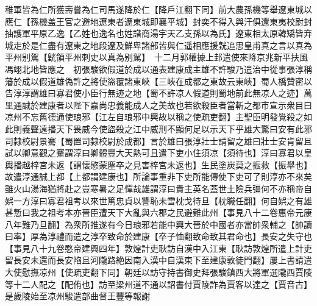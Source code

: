 稚軍皆為仁所獲壽嘗為仁司馬遂降於仁【降戶江翻下同】前大農孫機等舉遼東城以應仁【孫機盖王官之避地遼東者遼東城即襄平城】封奕不得入與汗俱還東夷校尉封抽護軍平原乙逸【乙姓也逸名也姓譜商湯宇天乙支孫以為氏】遼東相太原韓矯皆弃城走於是仁盡有遼東之地段遼及鮮卑諸部皆與仁遥相應援皝追思皇甫真之言以真為平州别駕【皝領平州刺史以真為别駕】　十二月郭權據上邽遣使來降京兆新平扶風馮翊北地皆應之　初張駿欲假道於成以通表建康成主雄不許駿乃遣治中從事張淳稱藩於成以假道雄偽許之將使盜覆諸東峽【三峽在成都之東故云東峽】蜀人橋贊密以告淳淳謂雄曰寡君使小臣行無迹之地【蜀不許凉人假道則蜀地前此無凉人之迹】萬里通誠於建康者以陛下嘉尚忠義能成人之美故也若欲殺臣者當斬之都市宣示衆目曰凉州不忘舊德通使琅邪【江左自琅邪中興故以稱之使疏吏翻】主聖臣明發覺殺之如此則義聲遠播天下畏威今使盜殺之江中威刑不顯何足以示天下乎雄大驚曰安有此邪司隸校尉景騫【蜀置司隸校尉於成都】言於雄曰張淳壯士請留之雄曰壯士安肯留且試以卿意觀之騫謂淳曰卿體豐大天熱可且遣下吏小住須凉【須待也】淳曰寡君以皇輿播越梓宮未返【謂懷愍蒙塵卒之見害梓宮未返也】生民塗炭莫之振救【振舉也】故遣淳通誠上都【上都謂建康也】所論事重非下吏所能傳使下吏可了則淳亦不來矣雖火山湯海猶將赴之豈寒暑之足憚哉雄謂淳曰貴主英名蓋世土險兵彊何不亦稱帝自娯一方淳曰寡君祖考以來世篤忠貞以讐恥未雪枕戈待旦【枕職任翻】何自娯之有雄甚慙曰我之祖考本亦晉臣遭天下大亂與六郡之民避難此州【事見八十二卷惠帝元康八年難乃旦翻】為衆所推遂有今日琅邪若能中興大晉於中國者亦當帥衆輔之【帥讀曰率】厚為淳禮而遣之淳卒致命於建康【卒子恤翻致命致其君命也】長安之失守也【事見八十九卷愍帝建興四年】敦煌計吏耿訪自漢中入江東【耿訪敦煌所遣上計吏留長安未還而長安陷且河隴路絶因南入漢中自漢東下至建康敦徒門翻】屢上書請遣大使慰撫凉州【使疏吏翻下同】朝廷以訪守持書御史拜張駿鎮西大將軍選隴西賈陵等十二人配之【配侑也】訪至梁州道不通以詔書付賈陵詐為賈客以達之【賈音古】是歲陵始至凉州駿遣部曲督王豐等報謝

